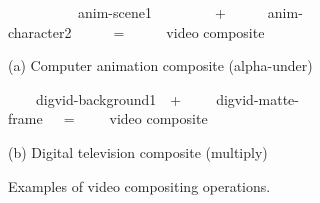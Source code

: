 \begin{figure}[t]
\begin{minipage}{1.1in}
\vspace{-4pt}
\vspace{2pt}
\end{minipage}
\begin{minipage}{1.1in}
\vspace{-4pt}
\vspace{2pt}
\end{minipage}
\begin{minipage}{1.1in}
\vspace{-4pt}
\vspace{2pt}
\end{minipage}

{\small ~~~~~~~~~~anim-scene1~~~~~~~~~+~~~~~~anim-character2~~~~~~=~~~~~~video composite}

\begin{center}
\vspace{-3pt}
(a) Computer animation composite (alpha-under)
\end{center} \vspace{6pt}

\begin{minipage}{1.1in}
\vspace{2pt}
\end{minipage}
\begin{minipage}{1.1in}
\vspace{2pt}
\end{minipage}
\begin{minipage}{1.1in}
\vspace{2pt}
\end{minipage}

{\small ~~~~digvid-background1~~+~~~~~digvid-matte-frame~~~=~~~~~video composite}

\begin{center}
\vspace{-3pt}
(b) Digital television composite (multiply)
\end{center}
\caption{Examples of video compositing operations.\protect\label{fig:videos}}
\end{figure}

\begin{table*}[t]
\vspace{-10pt}
\begin{minipage}{0.6in}
\mbox{~}
\end{minipage}
\caption{Results for composite transformations.
\protect\label{tab:composite-speedup}}
\end{table*}

